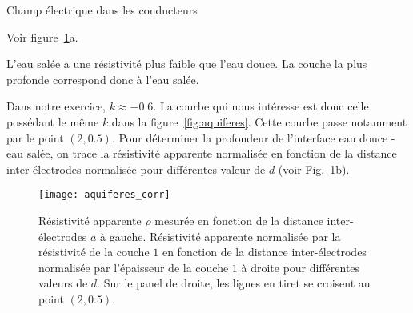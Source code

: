 \begin{corr}{Champ électrique dans les conducteurs}
	\begin{corrlist}
		\item Voir figure~\ref{fig:aquiferes_corr}a.
		\item {} L'eau salée a une résistivité plus faible
		  que l'eau douce. La couche la plus profonde correspond donc à l'eau salée.
		\item Dans notre exercice, $k \approx -0.6$. La courbe qui nous intéresse
		  est donc celle possédant le même $k$ dans la 
		  figure~\ref{fig:aquiferes}. Cette courbe passe notamment 
		  par le point $(2, 0.5)$. Pour déterminer la profondeur de 
		  l'interface eau douce - eau salée, on trace la résistivité apparente
		  normalisée en fonction de la distance inter-électrodes normalisée
		  pour différentes valeur de $d$ (voir Fig.~\ref{fig:aquiferes_corr}b).
	\end{corrlist}


\begin{figure}[h!]
	\centering
	\texttt{[image: aquiferes\_corr]}
	\caption{Résistivité apparente $\rho$ mesurée en fonction de la distance
	         inter-électrodes $a$ à gauche. Résistivité apparente normalisée
	 	 par la résistivité de la couche $1$ en fonction de la distance 
	 	inter-électrodes normalisée par l'épaisseur de la couche $1$
		à droite pour différentes valeurs de $d$. Sur le panel de 
		droite, les lignes en tiret se croisent au point $(2, 0.5)$.}%
	\label{fig:aquiferes_corr}
\end{figure}


\end{corr}
